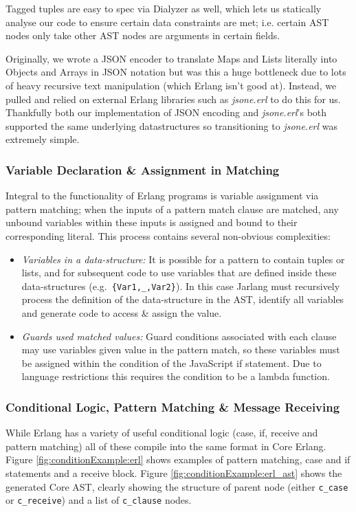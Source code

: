 \documentclass[twoside,12pt,titlepage,a4paper]{article}
\begin{document}
Tagged tuples are easy to spec via Dialyzer as well, which lets us statically analyse our code to ensure certain data constraints are met; i.e. certain AST nodes only take other AST nodes are arguments in certain fields.

Originally, we wrote a JSON encoder to translate Maps and Lists literally into Objects and Arrays in JSON notation but  was this a huge bottleneck due to lots of heavy recursive text manipulation (which Erlang isn't good at). Instead, we pulled and relied on external Erlang libraries such as \textit{jsone.erl} to do this for us. Thankfully both our implementation of JSON encoding and \textit{jsone.erl}'s both supported the same underlying datastructures so transitioning to \textit{jsone.erl} was extremely simple.

\subsubsection{Variable Declaration \& Assignment in Matching}
Integral to the functionality of Erlang programs is variable assignment via pattern matching; when the inputs of a pattern match clause are matched, any unbound variables within these inputs is assigned and bound to their corresponding literal. This process contains several non-obvious complexities:
\begin{itemize}
	\item \emph{Variables in a data-structure:} It is possible for a pattern to contain tuples or lists, and for subsequent code to use variables that are defined inside these data-structures (e.g.\texttt{ \{Var1,\_,Var2\}}). In this case Jarlang must recursively process the definition of the data-structure in the AST, identify all variables and generate code to access \& assign the value.
	\item \emph{Guards used matched values:} Guard conditions associated with each clause may use variables given value in the pattern match, so these variables must be assigned within the condition of the JavaScript if statement. Due to language restrictions this requires the condition to be a lambda function.
\end{itemize}
\subsubsection{Conditional Logic, Pattern Matching \& Message Receiving}
While Erlang has a variety of useful conditional logic (case, if, receive and pattern matching) all of these compile into the same format in Core Erlang. Figure \ref{fig:conditionExample:erl} shows examples of pattern matching, case and if statements and a receive block. Figure \ref{fig:conditionExample:erl_ast} shows the generated Core AST, clearly showing the structure of parent node (either \texttt{c\_case} or \texttt{c\_receive}) and a list of \texttt{c\_clause} nodes.
\end{document}
